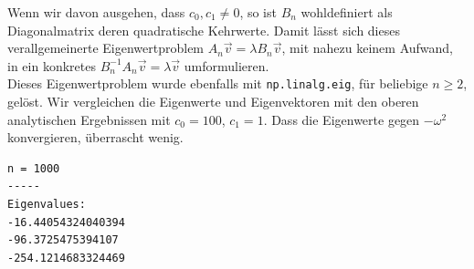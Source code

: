 Wenn wir davon ausgehen, dass $c_0, c_1 \neq 0$, so ist $B_n$ wohldefiniert als Diagonalmatrix deren quadratische Kehrwerte. Damit lässt sich dieses verallgemeinerte Eigenwertproblem $A_n \vec v = \lambda B_n \vec v$, mit nahezu keinem Aufwand, in ein konkretes $B_n^{-1} A_n \vec v = \lambda \vec v$ umformulieren. \\

Dieses Eigenwertproblem wurde ebenfalls mit \verb|np.linalg.eig|, für beliebige $n \geq 2$, gelöst. Wir vergleichen die Eigenwerte und Eigenvektoren mit den oberen \glqq analytischen\grqq{} Ergebnissen mit $c_0 = 100$, $c_1 = 1$. Dass die Eigenwerte gegen $-\omega^2$ konvergieren, überrascht wenig. \\

\begin{verbatim}
n = 1000
-----
Eigenvalues:
-16.44054324040394
-96.3725475394107
-254.1214683324469
\end{verbatim}
